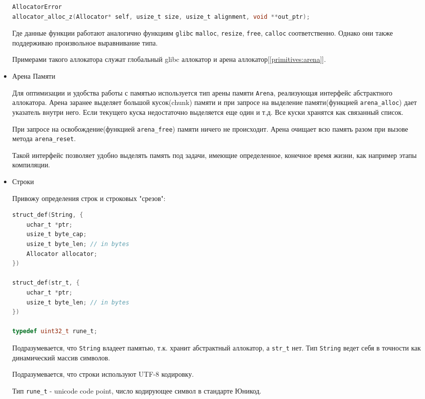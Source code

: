 \begin{itemize}
\begin{lstlisting}[language=c, caption={Интерфейс абстрактного аллокатора}, label={primitives:allocator-api}]
AllocatorError
allocator_alloc_z(Allocator* self, usize_t size, usize_t alignment, void **out_ptr);
\end{lstlisting} 

Где данные функции работают аналогично функциям \verb|glibc| \verb|malloc|, \verb|resize|, \verb|free|, \verb|calloc| соответственно.
Однако они также поддерживаю произвольное выравнивание типа.

Примерами такого аллокатора служат глобальный glibc аллокатор и арена аллокатор[\ref{primitives:arena}].

\item\label{primitives:arena} Арена Памяти

Для оптимизации и удобства работы с памятью используется тип арены памяти \verb|Arena|, реализующая интерфейс абстрактного аллокатора.
Арена заранее выделяет большой кусок(chunk) памяти и при запросе на выделение памяти(функцией \verb|arena_alloc|) дает указатель внутри него. Если текущего куска недостаточно выделяется еще один и т.д.
Все куски хранятся как связанный список.

При запросе на освобождение(функцией \verb|arena_free|) памяти ничего не происходит. Арена очищает всю память разом при вызове метода \verb|arena_reset|.

Такой интерфейс позволяет удобно выделять память под задачи, имеющие определенное, конечное время жизни, как например этапы компиляции.

\item Строки

Привожу определения строк и строковых "срезов":

\begin{lstlisting}[language=c, caption={Строки и строковые срезы}, label={primitives:string-struct}]
struct_def(String, {
    uchar_t *ptr;
    usize_t byte_cap;
    usize_t byte_len; // in bytes
    Allocator allocator;
})

struct_def(str_t, {
    uchar_t *ptr;
    usize_t byte_len; // in bytes
})

typedef uint32_t rune_t;
\end{lstlisting}

Подразумевается, что \verb|String| владеет памятью, т.к. хранит абстрактный аллокатор, а \verb|str_t| нет.
Тип \verb|String| ведет себя в точности как динамический массив символов.

Подразумевается, что строки используют UTF-8 кодировку.

Тип \verb|rune_t| - unicode code point, число кодирующее символ в стандарте Юникод.


\end{itemize}
